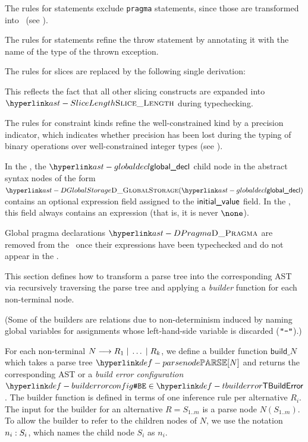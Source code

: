 The rules for statements exclude \texttt{pragma} statements, since those are transformed into
\passstatementsterm\ (see ).

The rules for statements refine the throw statement by annotating it with
the name of the type of the thrown exception.

The rules for slices are replaced by the following single derivation:

This reflects the fact that all other slicing constructs are expanded into
$\SliceLength$ during typechecking.

The rules for constraint kinds refine the well-constrained kind by a precision
indicator, which indicates whether precision has been lost during the typing of
binary operations over well-constrained integer types (see ).
\hypertarget{ast-typedWellConstrained}{}

In the \untypedast, the $\globaldecl$ child node in the abstract syntax nodes of the form $\DGlobalStorage(\globaldecl)$
contains an optional expression field assigned to the $\textsf{initial\_value}$ field. In the \typedast, this field
always contains an expression (that is, it is never $\none$).

Global pragma declarations $\DPragma$ are removed from the \untypedast\ once their expressions have been typechecked and do not appear in the \typedast.

This section defines how to transform a parse tree into the corresponding AST
via recursively traversing the parse tree and applying a \emph{builder} function
for each non-terminal node.

(Some of the builders are relations due to non-determinism induced by naming global variables
for assignments whose left-hand-side variable is discarded ($\texttt{"}\texttt{-}\texttt{"}$).)

\hypertarget{def-tbuilderror}{}
\hypertarget{def-builderrorconfig}{}
For each non-terminal $N \longrightarrow R_1 \;|\; \ldots \;|\; R_k$, we define a builder function
$\textsf{build\_}N $ which takes a parse tree $\parsenode{N}$ and returns the corresponding
AST or a \emph{build error configuration} $\BuildErrorConfig \in \TBuildError$.
The builder function is defined in terms of one inference rule per alternative $R_i$.
The input for the builder for an alternative $R = S_{1..m}$ is a parse node
$N(S_{1..m})$. To allow the builder to refer to the children nodes of $N$,
we use the notation $n_i:S_i$, which names the child node $S_i$ as $n_i$.

